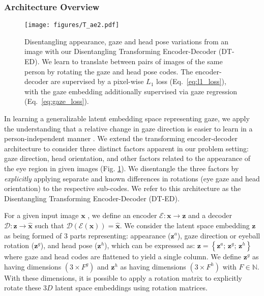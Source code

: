 \documentclass[10pt,twocolumn,letterpaper]{article}
\begin{document}
\subsubsection{Architecture Overview}
\begin{figure}
    \centering
    \vskip -0.5mm
    \texttt{[image: figures/T\_ae2.pdf]}
    \vskip -5.5mm
    \caption{Disentangling appearance, gaze and head pose variations from an image with our Disentangling Transforming Encoder-Decoder (DT-ED). We learn to translate between pairs of images of the same person by rotating the gaze and head pose codes. The encoder-decoder are supervised by a pixel-wise $L_1$ loss (Eq.~\ref{eq:l1_loss}), with the gaze embedding additionally supervised via gaze regression (Eq.~\ref{eq:gaze_loss}).}
    \label{fig:t_ae}
    \vspace*{-2mm}
\end{figure}
In learning a generalizable latent embedding space representing gaze, we apply the understanding that a relative change in gaze direction is easier to learn in a person-independent manner \cite{Liu2018BMVC}.
We extend the transforming encoder-decoder architecture \cite{Hinton2011ICANN,Worrall2017ICCV} to consider three distinct factors apparent in our problem setting: gaze direction, head orientation, and other factors related to the appearance of the eye region in given images (Fig. \ref{fig:t_ae}). 
We disentangle the three factors by \emph{explicitly} applying separate and known differences in rotations (eye gaze and head orientation) to the respective sub-codes.
We refer to this architecture as the Disentangling Transforming Encoder-Decoder (DT-ED).



For a given input image $\mathbf{x}$
, we define an encoder $\mathcal{E}: \mathbf{x}\rightarrow\mathbf{z}$ and a decoder $\mathcal{D}: \mathbf{z}\rightarrow\hat{\mathbf{x}}$ such that $\mathcal{D}\left(\mathcal{E}(\mathbf{x})\right)=\hat{\mathbf{x}}$.
We consider the latent space embedding $\mathbf{z}$ as being formed of 3 parts representing: appearance ($\mathbf{z}^a$), gaze direction or eyeball rotation ($\mathbf{z}^g$), and head pose ($\mathbf{z}^h$), which can be expressed as: $\mathbf{z} = \left\{\mathbf{z}^a;\,\mathbf{z}^g;\,\mathbf{z}^h\right\}$ where gaze and head codes are flattened to yield a single column.
We define $\mathbf{z}^g$ as having dimensions $\left(3\times F^g\right)$ and $\mathbf{z}^h$ as having dimensions $\left(3\times F^h\right)$ with $F \in \mathbb{N}$.
With these dimensions, it is possible to apply a rotation matrix to explicitly rotate these $3D$ latent space embeddings using rotation matrices.
\end{document}
